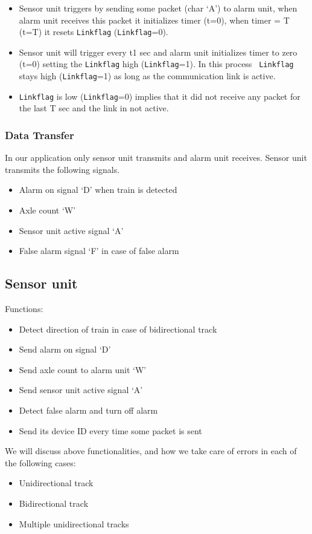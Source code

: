 \documentclass[aps,letterpaper,11pt]{article}
\begin{document}
\begin{itemize}
\item Sensor unit triggers by sending some packet (char `A') to alarm unit,
when alarm unit
receives this packet it initializes timer (t=0), when timer = T (t=T) it
resets \texttt{Linkflag}
(\texttt{Linkflag}=0).
\item Sensor unit will trigger every t1 sec and alarm unit initializes timer
to zero (t=0) setting
the \texttt{Linkflag} high (\texttt{Linkflag}=1). In this process \texttt{
Linkflag} stays high (\texttt{Linkflag}=1) as long
as the communication link is active.
\item \texttt{Linkflag} is low (\texttt{Linkflag}=0) implies that it did not
receive any packet for the last T sec and the link in not active.
\end{itemize}
\subsubsection{Data Transfer}
In our application only sensor unit transmits and alarm unit receives. Sensor
unit transmits the
following signals.
\begin{itemize}
\item Alarm on signal `D' when train is detected
\item Axle count `W'
\item Sensor unit active signal `A'
\item False alarm signal `F' in case of false alarm
\end{itemize}
\subsection{Sensor unit}
Functions:
\begin{itemize}
  \item Detect direction of train in case of bidirectional track
  \item Send alarm on signal `D'
  \item Send axle count to alarm unit `W'
  \item Send sensor unit active signal `A'
  \item Detect false alarm and turn off alarm
  \item Send its device ID every time some packet is sent
\end{itemize}

We will discuss above functionalities, and how we take care of errors in
each of the following cases:
\begin{itemize}
  \item Unidirectional track
  \item Bidirectional track
  \item Multiple unidirectional tracks
\end{itemize}
\end{document}
